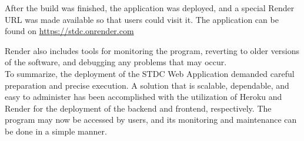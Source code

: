 \begin{justify}
        \vspace{0.25cm}
        \newendline After the build was finished, the application was deployed, and a special Render URL was made available so that users could visit it. The application can be found on \newendline \href{https://stdc.onrender.com}{https://stdc.onrender.com}
        
        
        \newendline Render also includes tools for monitoring the program, reverting to older versions of the software, and debugging any problems that may occur.\\

        \vspace{0.25cm}
        \newendline To summarize, the deployment of the STDC Web Application demanded careful preparation and precise execution. A solution that is scalable, dependable, and easy to administer has been accomplished with the utilization of Heroku and Render for the deployment of the backend and frontend, respectively. The program may now be accessed by users, and its monitoring and maintenance can be done in a simple manner.


\end{justify}